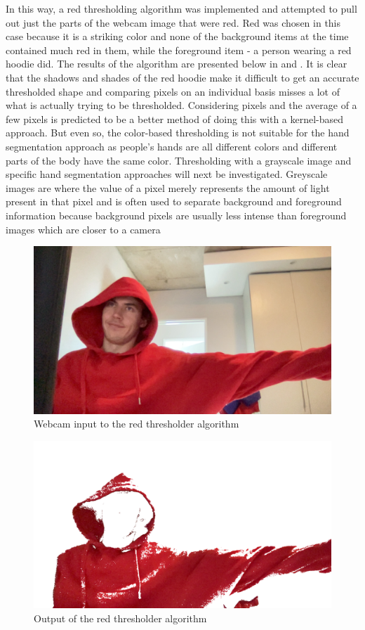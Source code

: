 In this way, a red thresholding algorithm was implemented and attempted to pull out just the parts of the webcam image that were red. Red was chosen in this case because it is a striking color and none of the background items at the time contained much red in them, while the foreground item - a person wearing a red hoodie did. The results of the algorithm are presented below in  and . It is clear that the shadows and shades of the red hoodie make it difficult to get an accurate thresholded shape and comparing pixels on an individual basis misses a lot of what is actually trying to be thresholded. Considering pixels and the average of a few pixels is predicted to be a better method of doing this with a kernel-based approach. But even so, the color-based thresholding is not suitable for the hand segmentation approach as people's hands are all different colors and different parts of the body have the same color. Thresholding with a grayscale image and specific hand segmentation approaches will next be investigated. Greyscale images are where the value of a pixel merely represents the amount of light present in that pixel and is often used to separate background and foreground information because background pixels are usually less intense than foreground images which are closer to a camera

\begin{figure}[h]
    \centering
    \includegraphics[width=0.4\linewidth]{figures/red_thresholder_original.png}
    \caption{Webcam input to the red thresholder algorithm}
    \label{fig:red_thresholder_original}
\end{figure}

\begin{figure}[h]
    \centering
    \includegraphics[width=0.4\linewidth]{figures/red_thresholder_test.png}
    \caption{Output of the red thresholder algorithm}
    \label{fig:red_thresholder_test}
\end{figure}

